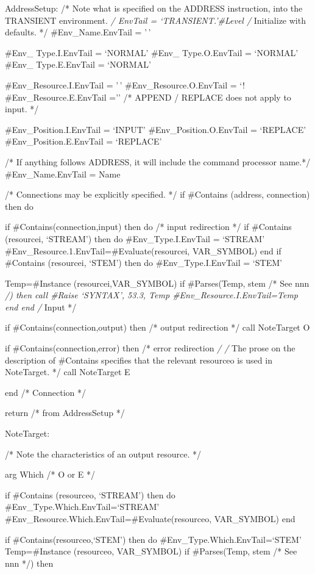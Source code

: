 AddressSetup: /* Note what is specified on the ADDRESS instruction, into
the TRANSIENT environment. \emph{/ EnvTail = `TRANSIENT.'\#Level /}
Initialize with defaults. */ \#Env\_Name.EnvTail = '\,'

\#Env\_ Type.I.EnvTail = `NORMAL' \#Env\_ Type.O.EnvTail = `NORMAL'
\#Env\_ Type.E.EnvTail = `NORMAL'

\#Env\_Resource.I.EnvTail = '\,' \#Env\_Resource.O.EnvTail = `!
\#Env\_Resource.E.EnvTail ='' /* APPEND / REPLACE does not apply to
input. */

\#Env\_Position.I.EnvTail = `INPUT' \#Env\_Position.O.EnvTail =
`REPLACE' \#Env\_Position.E.EnvTail = `REPLACE'

/* If anything follows ADDRESS, it will include the command processor
name.*/ \#Env\_Name.EnvTail = Name

/* Connections may be explicitly specified. */ if \#Contains (address,
connection) then do

if \#Contains(connection,input) then do /* input redirection */ if
\#Contains (resourcei, `STREAM') then do \#Env\_Type.I.EnvTail =
`STREAM' \#Env\_Resource.1.EnvTail=\#Evaluate(resourcei, VAR\_SYMBOL)
end if \#Contains (resourcei, `STEM') then do \#Env\_Type.I.EnvTail =
`STEM'

Temp=\#Instance (resourcei,VAR\_SYMBOL) if \#Parses(Temp, stem /* See
nnn \emph{/) then call \#Raise `SYNTAX', 53.3, Temp
\#Env\_Resource.I.EnvTail=Temp end end /} Input */

if \#Contains(connection,output) then /* output redirection */ call
NoteTarget O

if \#Contains(connection,error) then /* error redirection \emph{/ /} The
prose on the description of \#Contains specifies that the relevant
resourceo is used in NoteTarget. */ call NoteTarget E

end /* Connection */

return /* from AddressSetup */

NoteTarget:

/* Note the characteristics of an output resource. */

arg Which /* O or E */

if \#Contains (resourceo, `STREAM') then do
\#Env\_Type.Which.EnvTail=`STREAM'
\#Env\_Resource.Which.EnvTail=\#Evaluate(resourceo, VAR\_SYMBOL) end

if \#Contains(resourceo,`STEM') then do \#Env\_Type.Which.EnvTail=`STEM'
Temp=\#Instance (resourceo, VAR\_SYMBOL) if \#Parses(Temp, stem /* See
nnn */) then

